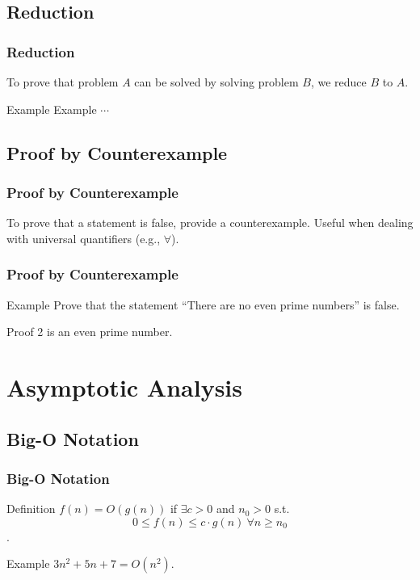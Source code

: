 \documentclass[t]{beamer}
\begin{document}
        \subsection{Reduction}
            \begin{frame}
                \frametitle{Reduction}
                To prove that problem $A$ can be solved by solving problem $B$, we reduce $B$ to $A$.

                \begin{block}{Example}
                    Example $\cdots$
                \end{block}
            \end{frame}


        \subsection{Proof by Counterexample}
            \begin{frame}
                \frametitle{Proof by Counterexample}
                To prove that a statement is false, provide a counterexample. Useful when dealing 
                with universal quantifiers (e.g., $\forall$).
            \end{frame}

            \begin{frame}
                \frametitle{Proof by Counterexample}
                \begin{block}{Example}
                    Prove that the statement ``There are no even prime numbers'' is false.
                \end{block}
                \begin{block}{Proof}
                    2 is an even prime number.
                \end{block}
            \end{frame}

    \section{Asymptotic Analysis}


        \subsection{Big-O Notation}
            \begin{frame}
                \frametitle{Big-O Notation}
                \begin{block}{Definition}
                    $f(n) = O(g(n))$ if $\exists c > 0$ and $n_0 > 0$ s.t. \[0 \leq f(n) \leq c \cdot g(n)\ \forall n \geq n_0\].
                \end{block}

                \begin{block}{Example}
                    $3n^2 + 5n + 7 = O(n^2)$.
                \end{block}
            \end{frame}
\end{document}
